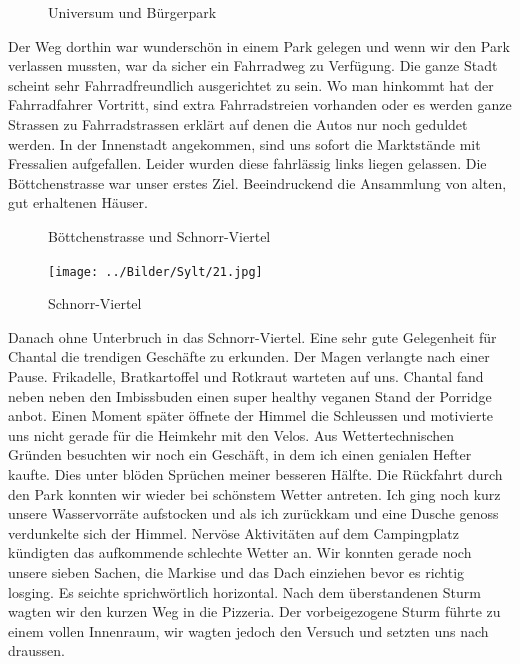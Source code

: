 \begin{figure}[H]
   \centering
   \quad
   \quad
   \caption[Universum und Bürgerpark]{Universum und Bürgerpark}
\end{figure}

Der Weg dorthin war wunderschön in einem Park gelegen und wenn wir den Park verlassen mussten, war da sicher ein Fahrradweg zu Verfügung.
Die ganze Stadt scheint sehr Fahrradfreundlich ausgerichtet zu sein.
Wo man hinkommt hat der Fahrradfahrer Vortritt, sind extra Fahrradstreien vorhanden oder es werden ganze Strassen zu Fahrradstrassen erklärt auf denen die Autos nur noch geduldet werden.
In der Innenstadt angekommen, sind uns sofort die Marktstände mit Fressalien aufgefallen. Leider wurden diese fahrlässig links liegen gelassen.
Die Böttchenstrasse war unser erstes Ziel. Beeindruckend die Ansammlung von alten, gut erhaltenen Häuser.

\begin{figure}[t]
   \centering
   \quad
   \quad
   \quad
   \caption[Böttchenstrasse und Schnorr-Viertel]{Böttchenstrasse und Schnorr-Viertel}
\end{figure}


\begin{figure} 
  \begin{centering}
    \texttt{[image: ../Bilder/Sylt/21.jpg]}
    \caption{Schnorr-Viertel}
  \end{centering}
\end{figure} 

Danach ohne Unterbruch in das Schnorr-Viertel.
Eine sehr gute Gelegenheit für Chantal die trendigen Geschäfte zu erkunden.
Der Magen verlangte nach einer Pause. 
Frikadelle, Bratkartoffel und Rotkraut warteten auf uns.
Chantal fand neben neben den Imbissbuden einen super healthy veganen Stand der Porridge anbot.
Einen Moment später öffnete der Himmel die Schleussen und motivierte uns nicht gerade für die Heimkehr mit den Velos.
Aus Wettertechnischen Gründen besuchten wir noch ein Geschäft, in dem ich einen genialen Hefter kaufte. 
Dies unter blöden Sprüchen meiner besseren Hälfte.
Die Rückfahrt durch den Park konnten wir wieder bei schönstem Wetter antreten.
Ich ging noch kurz unsere Wasservorräte aufstocken und als ich zurückkam und eine Dusche genoss verdunkelte sich der Himmel.
Nervöse Aktivitäten auf dem Campingplatz kündigten das aufkommende schlechte Wetter an.
Wir konnten gerade noch unsere sieben Sachen, die Markise und das Dach einziehen bevor es richtig losging.
Es seichte sprichwörtlich horizontal.
Nach dem überstandenen Sturm wagten wir den kurzen Weg in die Pizzeria.
Der vorbeigezogene Sturm führte zu einem vollen Innenraum, wir wagten jedoch den Versuch und setzten uns nach draussen.
\newpage
